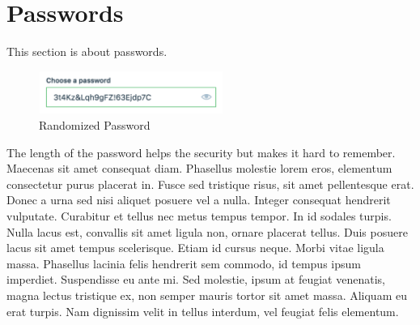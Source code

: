 \hypertarget{passwords}{%
\section{Passwords}\label{passwords}}

This section is about passwords.

\begin{figure}
\vspace{-8pt}
\includegraphics[width=2.38095in,height=0.54865in]{./05_authentication/01_passwords/media/image1.png}
\caption{Randomized Password}
\end{figure}


The length of the password helps the security but makes it hard to
remember. Maecenas sit amet consequat diam. Phasellus molestie lorem
eros, elementum consectetur purus placerat in. Fusce sed tristique
risus, sit amet pellentesque erat. Donec a urna sed nisi aliquet posuere
vel a nulla. Integer consequat hendrerit vulputate. Curabitur et tellus
nec metus tempus tempor. In id sodales turpis. Nulla lacus est,
convallis sit amet ligula non, ornare placerat tellus. Duis posuere
lacus sit amet tempus scelerisque. Etiam id cursus neque. Morbi vitae
ligula massa. Phasellus lacinia felis hendrerit sem commodo, id tempus
ipsum imperdiet. Suspendisse eu ante mi. Sed molestie, ipsum at feugiat
venenatis, magna lectus tristique ex, non semper mauris tortor sit amet
massa. Aliquam eu erat turpis. Nam dignissim velit in tellus interdum,
vel feugiat felis elementum.
